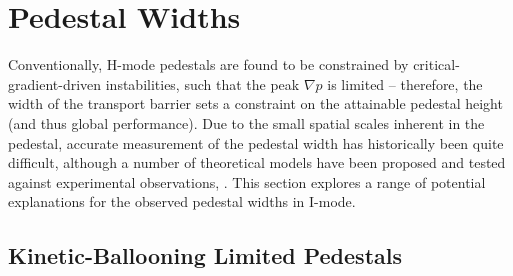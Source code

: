 \begin{figure}[t]
 \pushtooutside
\end{figure}

\section{Pedestal Widths}\label{sec:imode_width}

Conventionally, H-mode pedestals are found to be constrained by critical-gradient-driven instabilities, such that the peak $\nabla p$ is limited -- therefore, the width of the transport barrier sets a constraint on the attainable pedestal height (and thus global performance).  Due to the small spatial scales inherent in the pedestal, accurate measurement of the pedestal width has historically been quite difficult, although a number of theoretical models have been proposed and tested against experimental observations, \eg \cite{Maggi2010,Beurskens2011,Onjun2002}.  This section explores a range of potential explanations for the observed pedestal widths in I-mode.

\subsection{Kinetic-Ballooning Limited Pedestals}\label{subsec:imode_kbm}

